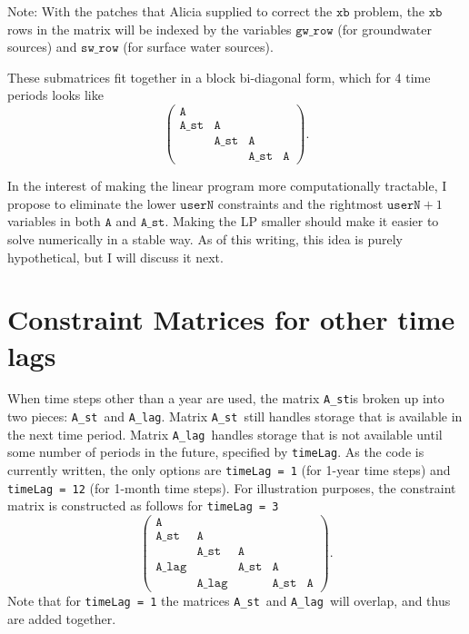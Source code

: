 \documentclass[11pt]{article}
\newcommand{\A}{\texttt{A}}
\newcommand{\Ast}{\texttt{A\_st}}
\newcommand{\Alag}{\texttt{A\_lag}}
\newcommand{\xb}{\texttt{xb}}
\newcommand{\userN}{\texttt{userN}}
\newcommand{\sw}{\texttt{sw\_row}}
\newcommand{\gw}{\texttt{gw\_row}}
\begin{document}
Note: With the patches that Alicia supplied to correct the $\xb$ problem, the $\xb$ rows in the matrix will be indexed by the variables $\gw$ (for groundwater sources) and $\sw$ (for surface water sources).

These submatrices fit together in a block bi-diagonal form, which for 4 time periods looks like
\[
	\left(
	\begin{array}{cccc}
		\A   &      &      &    \\
		\Ast & \A   &      &    \\
		     & \Ast & \A   &    \\
		     &      & \Ast & \A 
	\end{array}
	\right).
\]

In the interest of making the linear program more computationally tractable, I propose to eliminate the lower $\userN$ constraints and the rightmost $\userN+1$ variables in both $\A$ and $\Ast$.
Making the LP smaller should make it easier to solve numerically in a stable way.
As of this writing, this idea is purely hypothetical, but I will discuss it next.

\section*{Constraint Matrices for other time lags}

When time steps other than a year are used, the matrix \Ast is broken up into two pieces: \Ast\ and \Alag.
Matrix \Ast\ still handles storage that is available in the next time period.
Matrix \Alag\ handles storage that is not available until some number of periods in the future, specified by \texttt{timeLag}.
As the code is currently written, the only options are \texttt{timeLag = 1} (for 1-year time steps) and \texttt{timeLag = 12} (for 1-month time steps).
For illustration purposes, the constraint matrix is constructed as follows for \texttt{timeLag = 3}
\[
	\left(
	\begin{array}{ccccc}
		\A    &       &      &      &    \\
		\Ast  & \A    &      &      &    \\
		      & \Ast  & \A   &      &    \\
		\Alag &       & \Ast & \A   &    \\
		      & \Alag &      & \Ast & \A
	\end{array}
	\right).
\]
Note that for \texttt{timeLag = 1} the matrices \Ast\ and \Alag\ will overlap, and thus are added together.
\end{document}
